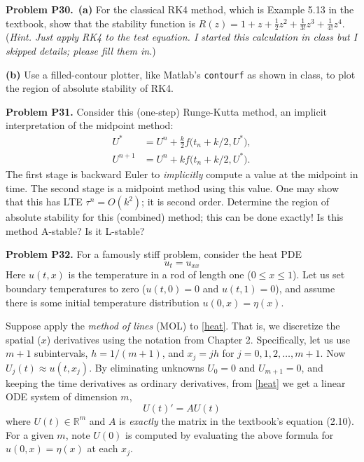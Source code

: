 \documentclass[12pt]{amsart}
\newcommand{\RR}{\mathbb{R}}
\newcommand{\prob}[1]{\bigskip\noindent\textbf{#1}\quad }
\newcommand{\epart}[1]{\medskip\noindent\textbf{(#1)}\quad }
\newcommand{\ppart}[1]{\,\textbf{(#1)}\quad }
\begin{document}
\prob{Problem P30.}  \ppart{a}  For the classical RK4 method, which is Example 5.13 in the textbook, show that the stability function is $R(z) = 1 + z + \frac{1}{2} z^2 + \frac{1}{3!} z^3 + \frac{1}{4!} z^4$.  (\emph{Hint.  Just apply RK4 to the test equation.  I started this calculation in class but I skipped details; please fill them in.})

\epart{b}  Use a filled-contour plotter, like Matlab's \texttt{contourf} as shown in class, to plot the region of absolute stability of RK4.


\prob{Problem P31.}  Consider this (one-step) Runge-Kutta method, an implicit interpretation of the midpoint method:
\begin{align*}
U^* &= U^n + \frac{k}{2} f\big(t_n + k/2, U^*\big),\\
U^{n+1} &= U^n + k f\big(t_n + k/2, U^*\big).
\end{align*}
The first stage is backward Euler to \emph{implicitly} compute a value at the midpoint in time.  The second stage is a midpoint method using this value.  One may show that this has LTE $\tau^n = O(k^2)$; it is second order.  Determine the region of absolute stability for this (combined) method; this can be done exactly!  Is this method A-stable?  Is it L-stable?


\prob{Problem P32.}  For a famously stiff problem, consider the heat PDE
\begin{equation}
u_t = u_{xx}  \label{heat}
\end{equation}
Here $u(t,x)$ is the temperature in a rod of length one ($0 \le x \le 1$).  Let us set boundary temperatures to zero ($u(t,0)=0$ and $u(t,1)=0$), and assume there is some initial temperature distribution $u(0,x)=\eta(x)$.

Suppose apply the \emph{method of lines} (MOL) to \eqref{heat}.  That is, we discretize the spatial ($x$) derivatives using the notation from Chapter 2.  Specifically, let us use $m+1$ subintervals, $h=1/(m+1)$, and $x_j = j h$ for $j=0,1,2,\dots,m+1$.  Now $U_j(t) \approx u(t,x_j)$.  By eliminating unknowns $U_0=0$ and $U_{m+1}=0$, and keeping the time derivatives as ordinary derivatives, from \eqref{heat} we get a linear ODE system of dimension $m$,
\begin{equation}
U(t)' = A U(t)  \label{mol}
\end{equation}
where $U(t) \in \RR^m$ and $A$ is \emph{exactly} the matrix in the textbook's equation (2.10).  For a given $m$, note $U(0)$ is computed by evaluating the above formula for $u(0,x)=\eta(x)$ at each $x_j$.
\end{document}
